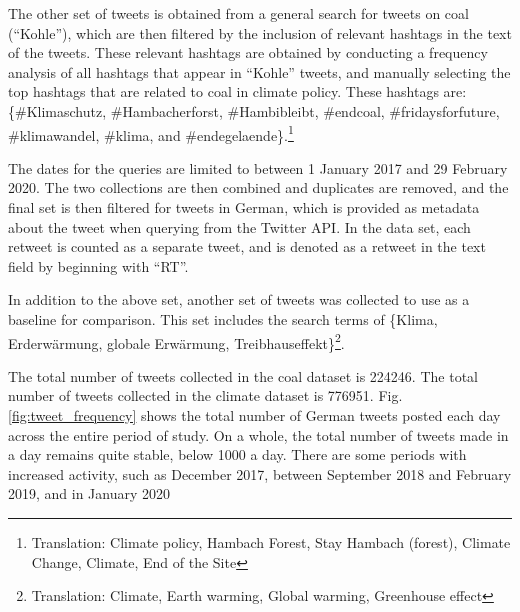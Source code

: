 \documentclass[12pt,onecolumn,twoside]{layout}
\begin{document}
The other set of tweets is obtained from a general search for tweets on coal (``Kohle''), which are then filtered by the inclusion of relevant hashtags in the text of the tweets. These relevant hashtags are obtained by conducting a frequency analysis of all hashtags that appear in ``Kohle'' tweets, and manually selecting the top hashtags that are related to coal in climate policy. These hashtags are:  \{\#Klimaschutz, \#Hambacherforst, \#Hambibleibt, \#endcoal, \#fridaysforfuture, \#klimawandel, \#klima, and \#endegelaende\}.\footnote{Translation: Climate policy, Hambach Forest, Stay Hambach (forest), Climate Change, Climate, End of the Site}

The dates for the queries are limited to between 1 January 2017 and 29 February 2020. The two collections are then combined and duplicates are removed, and the final set is then filtered for tweets in German, which is provided as metadata about the tweet when querying from the Twitter API. In the data set, each retweet is counted as a separate tweet, and is denoted as a retweet in the text field by beginning with ``RT''.

In addition to the above set, another set of tweets was collected to use as a baseline for comparison. This set includes the search terms of \{Klima, Erderwärmung, globale Erwärmung, Treibhauseffekt\}\footnote{Translation: Climate, Earth warming, Global warming, Greenhouse effect}.

The total number of tweets collected in the coal dataset is 224246. The total number of tweets collected in the climate dataset is 776951. Fig. \ref{fig:tweet_frequency} shows the total number of German tweets posted each day across the entire period of study. On a whole, the total number of tweets made in a day remains quite stable, below 1000 a day. There are some periods with increased activity, such as December 2017, between September 2018 and February 2019, and in January 2020
\end{document}
